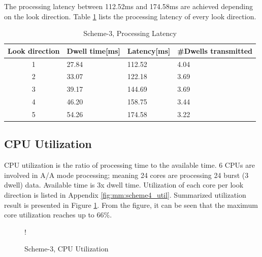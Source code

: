 The processing latency between 112.52ms and 174.58ms are achieved depending on the look direction. Table \ref{tbl:mm:scheme4_latency} lists the processing latency of every look direction.
\begin{table}[h!]
	\centering
	\begin{tabular}{|c|l|l|l|} 
	 \hline
	 \textbf{Look direction} & \textbf{Dwell time[ms]} & \textbf{Latency[ms]} & \textbf{\#Dwells transmitted} \\
	 \hline
	 1 & 27.84 & 112.52 & 4.04 \\ \hline
	 2 & 33.07 & 122.18 & 3.69 \\ \hline
	 3 & 39.17 & 144.69 & 3.69 \\ \hline
	 4 & 46.20 & 158.75 & 3.44 \\ \hline
	 5 & 54.26 & 174.58 & 3.22 \\ \hline
	\end{tabular}
	\caption{Scheme-3, Processing Latency}
	\label{tbl:mm:scheme4_latency}
\end{table}
\FloatBarrier

\subsection{CPU Utilization}
\label{ss:mm:scheme4:cpu_load}
CPU utilization is the ratio of processing time to the available time. 6 CPUs are involved in A/A mode processing; meaning 24 cores are processing 24 burst (3 dwell) data. Available time is 3x dwell time. Utilization of each core per look direction is listed in Appendix \ref{fig:mm:scheme4_util}. Summarized utilization result is presented in Figure \ref{sch3:chrt:cpu_util}. From the figure, it can be seen that the maximum core utilization reaches up to 66\%.
\begin{figure}[h!]
\centering
\resizebox {11cm} {!} {
}
\caption{Scheme-3, CPU Utilization}
\label{sch3:chrt:cpu_util}
\end{figure}
		

